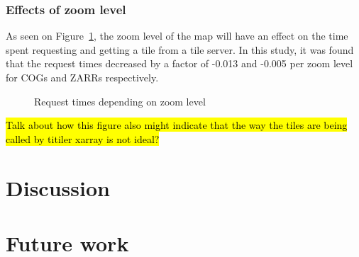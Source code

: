 \documentclass[
  oneside,
  open=any]{scrbook}
\begin{document}
\subsection{Effects of zoom level}\label{effects-of-zoom-level}

As seen on Figure~\ref{fig-comp-zoom}, the zoom level of the map will
have an effect on the time spent requesting and getting a tile from a
tile server. In this study, it was found that the request times
decreased by a factor of -0.013 and -0.005 per zoom level for COGs and
ZARRs respectively.

\begin{figure}[H]


\caption{\label{fig-comp-zoom}Request times depending on zoom level}

\end{figure}%

\hl{Talk about how this figure also might indicate that the way the tiles are being called by titiler xarray is not ideal?}

\chapter{Discussion}\label{discussion}

\chapter{Future work}\label{future-work}
\end{document}

